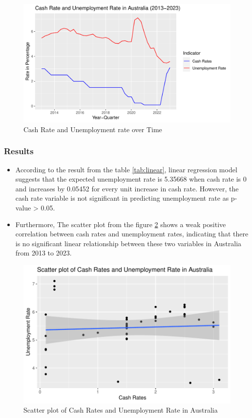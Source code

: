 \documentclass[11pt,a4paper,]{article}
\providecommand{\tightlist}{%
  \setlength{\itemsep}{0pt}\setlength{\parskip}{0pt}}
\begin{document}
\begin{figure}[H]
\includegraphics{Analysis_files/figure-latex/trend-1} \caption{Cash Rate and Unemployment rate over Time}\label{fig:trend}
\end{figure}

\hypertarget{results}{%
\subsubsection{Results}\label{results}}

\begin{itemize}
\tightlist
\item
  According to the result from the table \ref{tab:linear}, linear regression model suggests that the expected unemployment rate is 5.35668 when cash rate is 0 and increases by 0.05452 for every unit increase in cash rate. However, the cash rate variable is not significant in predicting unemployment rate as p-value \textgreater{} 0.05.
\item
  Furthermore, The scatter plot from the figure \ref{fig:scatter} shows a weak positive correlation between cash rates and unemployment rates, indicating that there is no significant linear relationship between these two variables in Australia from 2013 to 2023.
\end{itemize}

\begin{figure}[H]

{\centering \includegraphics{Analysis_files/figure-latex/scatter-1} 

}

\caption{Scatter plot of Cash Rates and Unemployment Rate in Australia}\label{fig:scatter}
\end{figure}
\end{document}
